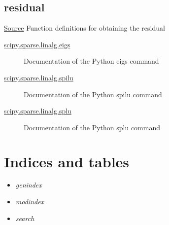 \documentclass[letterpaper,10pt,english]{sphinxmanual}
\begin{document}
\section{residual}
\label{index:residual}
\href{https://bitbucket.org/akadar/brakesqueal0.1/src/10fdbd0824e88ebbee4f44cefa781c01e586db41/brake/analyze/residual.py?at=master}{Source}
\label{index:module-brake.analyze.residual}
Function definitions for obtaining the residual



\begin{description}
\item[{\href{http://docs.scipy.org/doc/scipy-0.14.0/reference/generated/scipy.sparse.linalg.eigs.html}{scipy.sparse.linalg.eigs}}] \leavevmode
Documentation of the Python eigs command

\item[{\href{http://docs.scipy.org/doc/scipy-0.14.0/reference/generated/scipy.sparse.linalg.spilu.html}{scipy.sparse.linalg.spilu}}] \leavevmode
Documentation of the Python spilu command

\item[{\href{http://docs.scipy.org/doc/scipy-0.14.0/reference/generated/scipy.sparse.linalg.splu.html}{scipy.sparse.linalg.splu}}] \leavevmode
Documentation of the Python splu command

\end{description}




\chapter{Indices and tables}
\label{index:indices-and-tables}\begin{itemize}
\item {} 
\emph{genindex}

\item {} 
\emph{modindex}

\item {} 
\emph{search}

\end{itemize}
\end{document}
